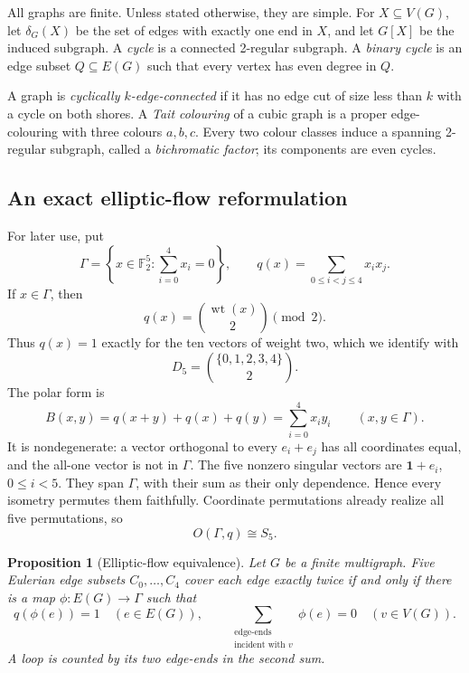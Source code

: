 \documentclass[11pt]{article}
\newtheorem{proposition}[theorem]{Proposition}
\theoremstyle{definition}
\theoremstyle{remark}
\begin{document}
All graphs are finite.  Unless stated otherwise, they are simple.  For
\(X\subseteq V(G)\), let \(\delta_G(X)\) be the set of edges with exactly
one end in \(X\), and let \(G[X]\) be the induced subgraph.  A
\emph{cycle} is a connected 2-regular subgraph.  A \emph{binary cycle}
is an edge subset \(Q\subseteq E(G)\) such that every vertex has even
degree in \(Q\).

A graph is \emph{cyclically \(k\)-edge-connected} if it has no edge cut
of size less than \(k\) with a cycle on both shores.  A
\emph{Tait colouring} of a cubic graph is a proper edge-colouring with
three colours \(a,b,c\).  Every two colour classes induce a spanning
2-regular subgraph, called a \emph{bichromatic factor}; its components
are even cycles.

\subsection*{An exact elliptic-flow reformulation}

For later use, put
\[
 \Gamma=\left\{x\in\mathbb F_2^5:\sum_{i=0}^4x_i=0\right\},
 \qquad
 q(x)=\sum_{0\leq i<j\leq4}x_ix_j.                    \tag{2.1}
 \label{eq:quadratic-space}
\]
If \(x\in\Gamma\), then
\[
 q(x)=\binom{\operatorname{wt}(x)}2\pmod2.
\]
Thus \(q(x)=1\) exactly for the ten vectors of weight two, which we
identify with
\[
 D_5=\binom{\{0,1,2,3,4\}}2.                          \tag{2.2}
 \label{eq:d5}
\]
The polar form is
\[
 B(x,y)=q(x+y)+q(x)+q(y)=\sum_{i=0}^4x_iy_i
 \qquad(x,y\in\Gamma).                                \tag{2.3}
\]
It is nondegenerate: a vector orthogonal to every \(e_i+e_j\) has all
coordinates equal, and the all-one vector is not in \(\Gamma\).
The five nonzero singular vectors are
\(\mathbf1+e_i\), \(0\leq i<5\).  They span \(\Gamma\), with their sum
as their only dependence.  Hence every isometry permutes them
faithfully.  Coordinate permutations already realize all five
permutations, so
\[
 O(\Gamma,q)\cong S_5.                                 \tag{2.4}
\]

\begin{proposition}[Elliptic-flow equivalence]
\label{prop:elliptic-flow}
Let \(G\) be a finite multigraph.  Five Eulerian edge subsets
\(C_0,\ldots,C_4\) cover each edge exactly twice if and only if there is
a map \(\phi:E(G)\to\Gamma\) such that
\[
 q(\phi(e))=1\quad(e\in E(G)),\qquad
 \sum_{\substack{\text{edge-ends}\\\text{incident with }v}}\phi(e)=0
 \quad(v\in V(G)).                                     \tag{2.5}
 \label{eq:anisotropic-flow}
\]
A loop is counted by its two edge-ends in the second sum.
\end{proposition}
\end{document}
